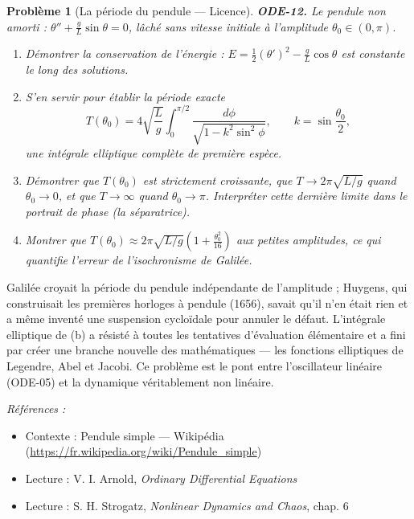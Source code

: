 \documentclass[11pt]{article}
\newtheorem{problem}{Problème}
\newenvironment{refs}{\par\small\noindent\emph{Références :}\begin{itemize}\setlength\itemsep{0pt}}{\end{itemize}\normalsize}
\begin{document}
\begin{problem}[{La période du pendule --- Licence}]
\textbf{ODE-12.} Le pendule non amorti : $ \theta'' + \frac{g}{L} \sin\theta = 0 $, lâché
sans vitesse initiale à l'amplitude $ \theta_0 \in (0, \pi) $.
\begin{enumerate}
\item[(a)] Démontrer la conservation de l'énergie :
$ E = \frac{1}{2} (\theta')^2 - \frac{g}{L} \cos\theta $ est constante le long des
solutions.
\item[(b)] S'en servir pour établir la période exacte
\[ T(\theta_0) = 4 \sqrt{\frac{L}{g}} \int_0^{\pi/2}
\frac{d\phi}{\sqrt{1 - k^2 \sin^2\phi}}, \qquad k = \sin\frac{\theta_0}{2} , \]
une intégrale elliptique complète de première espèce.
\item[(c)] Démontrer que $ T(\theta_0) $ est strictement croissante, que
$ T \to 2\pi \sqrt{L/g} $ quand $ \theta_0 \to 0 $, et que $ T \to \infty $ quand
$ \theta_0 \to \pi $. Interpréter cette dernière limite dans le portrait de phase (la
séparatrice).
\item[(d)] Montrer que $ T(\theta_0) \approx 2\pi \sqrt{L/g} \left( 1 + \frac{\theta_0^2}{16} \right) $
aux petites amplitudes, ce qui quantifie l'erreur de l'isochronisme de Galilée.
\end{enumerate}

\end{problem}

\noindent Galilée croyait la période du pendule indépendante de l'amplitude ; Huygens,
qui construisait les premières horloges à pendule (1656), savait qu'il n'en était rien et a même
inventé une suspension cycloïdale pour annuler le défaut. L'intégrale elliptique de (b) a résisté
à toutes les tentatives d'évaluation élémentaire et a fini par créer une branche nouvelle des
mathématiques --- les fonctions elliptiques de Legendre, Abel et Jacobi. Ce problème est le pont
entre l'oscillateur linéaire (ODE-05) et la dynamique véritablement non linéaire.

\begin{refs}
\item Contexte : Pendule simple --- Wikipédia (\url{https://fr.wikipedia.org/wiki/Pendule_simple})
\item Lecture : V. I. Arnold, \textit{Ordinary Differential Equations}
\item Lecture : S. H. Strogatz, \textit{Nonlinear Dynamics and Chaos}, chap. 6
\end{refs}

\bigskip
\end{document}
